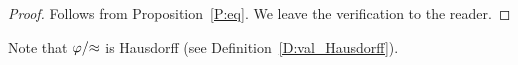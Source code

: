 \documentclass[main.tex]{subfiles}
\begin{document}
\begin{proof}
Follows from Proposition~\ref{P:eq}.
We leave the verification to the reader.
\end{proof}
\begin{rem}
Note that $\varphi/{\approx}$ is Hausdorff 
(see Definition~\ref{D:val_Hausdorff}).
\end{rem}
%
\end{document}
